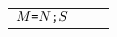 \documentclass[12pt,twoside]{report}
\begin{document}
\begin{figure}
\begin{adjustwidth}{-1cm}{-1cm}
\begin{tabular}{p{2.5cm}|cc}
    \\$M \text{\texttt{=}} N \text{\texttt{;}} S$ &
    \raisebox{-6ex}{$\dfrac{
      \begin{array}{cl}
        \Omega \vdash N \erasedreadarrow v \dashv \Omega' \\
        \Omega' \vdash M \erasedwritearrow v \dashv \Omega'' \\
        \Omega \vdash S_t \erasedreadarrow t \\
        \Omega'' \vdash S_t \erasedreadarrow t' \\
        t' \subtype t \\
        \Omega'' \vdash S \subtype S_t \movearrow w
      \end{array}
    }{
      \Omega \vdash M \mono{=} N \mono{;} S \subtype S_t \movearrow w
    }$} &
    \raisebox{-6ex}{$\dfrac{
      \begin{array}{cl}
        \Omega \vdash N \erasedreadarrow v \dashv \Omega' \\
        \Omega' \vdash M \erasedwritearrow v \dashv \Omega'' \\
        \Omega'' \vdash S_t \erasedreadarrow w
      \end{array}
    }{
      \Omega \vdash M \mono{=} N \mono{;} S_t \erasedreadarrow w
    }$} \\


\end{tabular}
\end{adjustwidth}
\end{figure}
\end{document}
